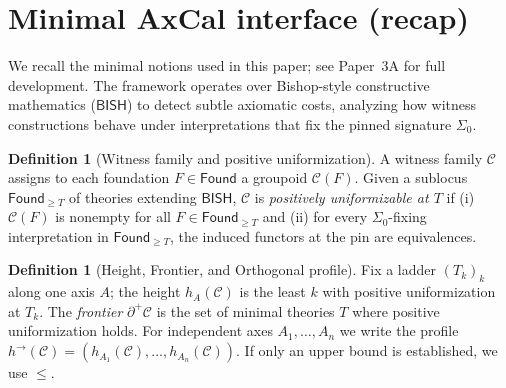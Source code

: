 \documentclass[11pt]{article}
\theoremstyle{plain}
\theoremstyle{definition}
\newtheorem{definition}[theorem]{Definition}
\theoremstyle{remark}
\newcommand{\BISH}{\mathsf{BISH}}
\newcommand{\Found}{\mathsf{Found}}
\newcommand{\SigmaZero}{\Sigma_{0}}
\newcommand{\Frontierpos}{\partial^{+}}
\begin{document}
\section{Minimal AxCal interface (recap)}

We recall the minimal notions used in this paper; see Paper~3A \cite{Paper3A} for full development. The framework operates over Bishop-style constructive mathematics ($\BISH$) to detect subtle axiomatic costs, analyzing how witness constructions behave under interpretations that fix the pinned signature $\SigmaZero$.

\begin{definition}[Witness family and positive uniformization]
A witness family $\mathcal{C}$ assigns to each foundation $F\in\Found$ a groupoid $\mathcal{C}(F)$.
Given a sublocus $\Found_{\ge T}$ of theories extending $\BISH$, $\mathcal{C}$ is \emph{positively uniformizable at $T$}
if (i) $\mathcal{C}(F)$ is nonempty for all $F\in \Found_{\ge T}$ and (ii) for every $\SigmaZero$-fixing interpretation in $\Found_{\ge T}$,
the induced functors at the pin are equivalences.
\end{definition}

\begin{definition}[Height, Frontier, and Orthogonal profile]
Fix a ladder $(T_k)_k$ along one axis $A$; the height $h_A(\mathcal{C})$ is the least $k$ with positive uniformization at $T_k$.
The \emph{frontier} $\Frontierpos\mathcal{C}$ is the set of minimal theories $T$ where positive uniformization holds.
For independent axes $A_1,\dots,A_n$ we write the profile
$h^{\to}(\mathcal{C})=(h_{A_1}(\mathcal{C}),\ldots,h_{A_n}(\mathcal{C}))$. If only an upper bound is established, we use $\le$.
\end{definition}

\end{document}
